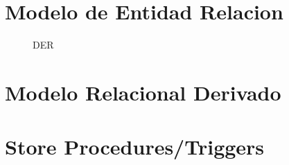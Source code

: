\documentclass[a4paper,11pt]{article}
\begin{document}



\tableofcontents

\newpage


\section{Modelo de Entidad Relacion}
\begin{figure}[H]
\caption{DER}
\end{figure}

\newpage

\newpage

\section{Modelo Relacional Derivado}



\newpage


\section{Store Procedures/Triggers}



\newpage
\end{document}
